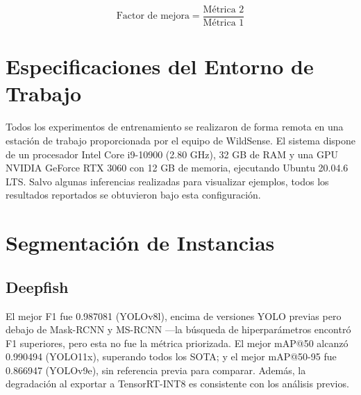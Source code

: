 \begin{equation}
  \text{Factor de mejora} = \dfrac{\text{Métrica 2}}{\text{Métrica 1}}
  \label{eq:improvement_factor}
\end{equation}

\section{Especificaciones del Entorno de Trabajo}
Todos los experimentos de entrenamiento se realizaron de forma remota en una estación de trabajo proporcionada por el equipo de WildSense. El sistema dispone de un procesador Intel Core i9-10900 (2.80 GHz), 32 GB de RAM y una GPU NVIDIA GeForce RTX 3060 con 12 GB de memoria, ejecutando Ubuntu 20.04.6 LTS. Salvo algunas inferencias realizadas para visualizar ejemplos, todos los resultados reportados se obtuvieron bajo esta configuración.

\newpage
\section{Segmentación de Instancias}
\subsection{Deepfish}
El mejor F1 fue 0.987081 (YOLOv8l), encima de versiones YOLO previas pero debajo de Mask-RCNN y MS-RCNN ---la búsqueda de hiperparámetros encontró F1 superiores, pero esta no fue la métrica priorizada. El mejor mAP@50 alcanzó 0.990494 (YOLO11x), superando todos los SOTA; y el mejor mAP@50-95 fue 0.866947 (YOLOv9e), sin referencia previa para comparar. Además, la degradación al exportar a TensorRT-INT8 es consistente con los análisis previos.


